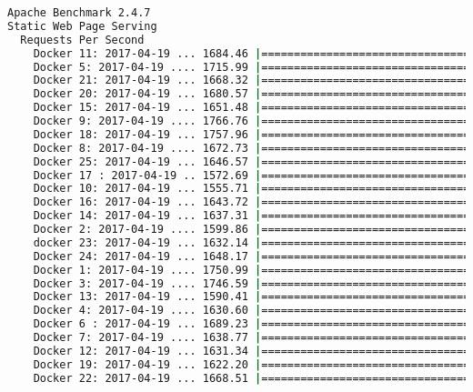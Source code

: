 \documentclass[french]{article}
\begin{document}
\begin{lstlisting}[language=bash,caption={}]
Apache Benchmark 2.4.7
Static Web Page Serving
  Requests Per Second
    Docker 11: 2017-04-19 ... 1684.46 |======================================
    Docker 5: 2017-04-19 .... 1715.99 |=======================================
    Docker 21: 2017-04-19 ... 1668.32 |======================================
    Docker 20: 2017-04-19 ... 1680.57 |======================================
    Docker 15: 2017-04-19 ... 1651.48 |=====================================
    Docker 9: 2017-04-19 .... 1766.76 |========================================
    Docker 18: 2017-04-19 ... 1757.96 |========================================
    Docker 8: 2017-04-19 .... 1672.73 |======================================
    Docker 25: 2017-04-19 ... 1646.57 |=====================================
    Docker 17 : 2017-04-19 .. 1572.69 |====================================
    Docker 10: 2017-04-19 ... 1555.71 |===================================
    Docker 16: 2017-04-19 ... 1643.72 |=====================================
    Docker 14: 2017-04-19 ... 1637.31 |=====================================
    Docker 2: 2017-04-19 .... 1599.86 |====================================
    docker 23: 2017-04-19 ... 1632.14 |=====================================
    Docker 24: 2017-04-19 ... 1648.17 |=====================================
    Docker 1: 2017-04-19 .... 1750.99 |========================================
    Docker 3: 2017-04-19 .... 1746.59 |========================================
    Docker 13: 2017-04-19 ... 1590.41 |====================================
    Docker 4: 2017-04-19 .... 1630.60 |=====================================
    Docker 6 : 2017-04-19 ... 1689.23 |======================================
    Docker 7: 2017-04-19 .... 1638.77 |=====================================
    Docker 12: 2017-04-19 ... 1631.34 |=====================================
    Docker 19: 2017-04-19 ... 1622.20 |=====================================
    Docker 22: 2017-04-19 ... 1668.51 |======================================


\end{lstlisting}
\end{document}
